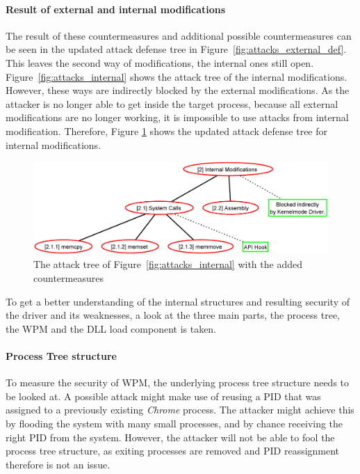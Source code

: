 \paragraph{Result of external and internal modifications}
The result of these countermeasures and additional possible countermeasures can be seen in the updated attack defense tree in Figure~\ref{fig:attacks_external_def}. This leaves the second way of modifications, the internal ones still open. Figure~\ref{fig:attacks_internal} shows the attack tree of the internal modifications. However, these ways are indirectly blocked by the external modifications. As the attacker is no longer able to get inside the target process, because all external modifications are no longer working, it is impossible to use attacks from internal modification. Therefore, Figure \ref{fig:attacks_internal_def} shows the updated attack defense tree for internal modifications.
\begin{figure}[h]
\centering
\includegraphics[scale=0.25]{sections/adtrees/InternalModifications.png}
\caption{The attack tree of Figure~\ref{fig:attacks_internal} with the added countermeasures}
\label{fig:attacks_internal_def}
\end{figure}
To get a better understanding of the internal structures and resulting security of the driver and its weaknesses, a look at the three main parts, the process tree, the \gls{WPM} and the \gls{DLL} load component is taken.

\paragraph{Process Tree structure}
To measure the security of \gls{WPM}, the underlying process tree structure needs to be looked at.
A possible attack might make use of reusing a \gls{PID} that was assigned to a previously existing \emph{Chrome} process. The attacker might achieve this by flooding the system with many small processes, and by chance receiving the right \gls{PID} from the system. However, the attacker will not be able to fool the process tree structure, as exiting processes are removed and \gls{PID} reassignment therefore is not an issue. 

